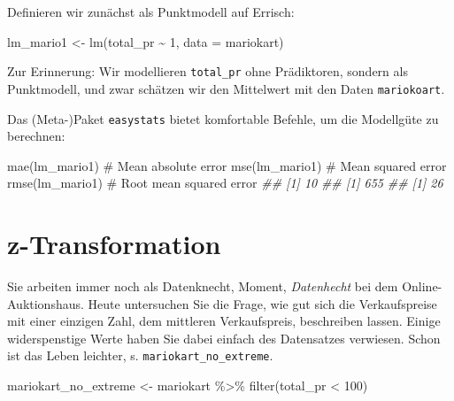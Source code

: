 \documentclass[
  letterpaper,
]{scrbook}
\newenvironment{Shaded}{\begin{snugshade}}{\end{snugshade}}
\newcommand{\AttributeTok}[1]{\textcolor[rgb]{0.40,0.45,0.13}{#1}}
\newcommand{\CommentTok}[1]{\textcolor[rgb]{0.37,0.37,0.37}{#1}}
\newcommand{\DecValTok}[1]{\textcolor[rgb]{0.68,0.00,0.00}{#1}}
\newcommand{\DocumentationTok}[1]{\textcolor[rgb]{0.37,0.37,0.37}{\textit{#1}}}
\newcommand{\FunctionTok}[1]{\textcolor[rgb]{0.28,0.35,0.67}{#1}}
\newcommand{\NormalTok}[1]{\textcolor[rgb]{0.00,0.23,0.31}{#1}}
\newcommand{\OtherTok}[1]{\textcolor[rgb]{0.00,0.23,0.31}{#1}}
\newcommand{\SpecialCharTok}[1]{\textcolor[rgb]{0.37,0.37,0.37}{#1}}
\theoremstyle{definition}
\theoremstyle{definition}
\theoremstyle{definition}
\theoremstyle{remark}
\begin{document}
Definieren wir zunächst als Punktmodell auf Errisch:

\begin{Shaded}
\begin{Highlighting}[]
\NormalTok{lm\_mario1 }\OtherTok{\textless{}{-}} \FunctionTok{lm}\NormalTok{(total\_pr }\SpecialCharTok{\textasciitilde{}} \DecValTok{1}\NormalTok{, }\AttributeTok{data =}\NormalTok{ mariokart)}
\end{Highlighting}
\end{Shaded}

Zur Erinnerung: Wir modellieren \texttt{total\_pr} ohne Prädiktoren,
sondern als Punktmodell, und zwar schätzen wir den Mittelwert mit den
Daten \texttt{mariokoart}.

Das (Meta-)Paket \texttt{easystats} bietet komfortable Befehle, um die
Modellgüte zu berechnen:

\begin{Shaded}
\begin{Highlighting}[]
\FunctionTok{mae}\NormalTok{(lm\_mario1)  }\CommentTok{\# Mean absolute error}
\FunctionTok{mse}\NormalTok{(lm\_mario1)  }\CommentTok{\# Mean squared error}
\FunctionTok{rmse}\NormalTok{(lm\_mario1)  }\CommentTok{\# Root mean squared error}
\DocumentationTok{\#\# [1] 10}
\DocumentationTok{\#\# [1] 655}
\DocumentationTok{\#\# [1] 26}
\end{Highlighting}
\end{Shaded}

\section{z-Transformation}\label{z-transformation}

Sie arbeiten immer noch als Datenknecht, Moment, \emph{Datenhecht} bei
dem Online-Auktionshaus. Heute untersuchen Sie die Frage, wie gut sich
die Verkaufspreise mit einer einzigen Zahl, dem mittleren Verkaufspreis,
beschreiben lassen. Einige widerspenstige Werte haben Sie dabei einfach
des Datensatzes verwiesen. Schon ist das Leben leichter, s.
\texttt{mariokart\_no\_extreme}.

\begin{Shaded}
\begin{Highlighting}[]
\NormalTok{mariokart\_no\_extreme }\OtherTok{\textless{}{-}} 
\NormalTok{  mariokart }\SpecialCharTok{\%\textgreater{}\%} 
  \FunctionTok{filter}\NormalTok{(total\_pr }\SpecialCharTok{\textless{}} \DecValTok{100}\NormalTok{)}
\end{Highlighting}
\end{Shaded}
\end{document}
